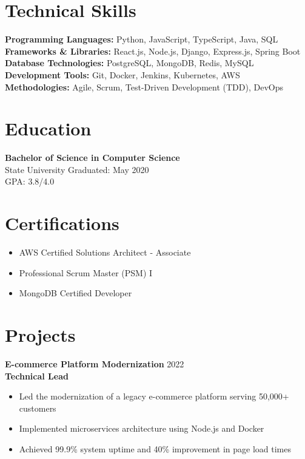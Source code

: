 \documentclass{article}
\begin{document}
\section{Technical Skills}

\textbf{Programming Languages:} Python, JavaScript, TypeScript, Java, SQL\\
\textbf{Frameworks \& Libraries:} React.js, Node.js, Django, Express.js, Spring Boot\\
\textbf{Database Technologies:} PostgreSQL, MongoDB, Redis, MySQL\\
\textbf{Development Tools:} Git, Docker, Jenkins, Kubernetes, AWS\\
\textbf{Methodologies:} Agile, Scrum, Test-Driven Development (TDD), DevOps

\section{Education}

\textbf{Bachelor of Science in Computer Science}\\
State University \hfill Graduated: May 2020\\
GPA: 3.8/4.0

\section{Certifications}
\begin{itemize}
    \item AWS Certified Solutions Architect - Associate
    \item Professional Scrum Master (PSM) I
    \item MongoDB Certified Developer
\end{itemize}

\section{Projects}

\textbf{E-commerce Platform Modernization} \hfill 2022\\
\textbf{Technical Lead}
\begin{itemize}
    \item Led the modernization of a legacy e-commerce platform serving 50,000+ customers
    \item Implemented microservices architecture using Node.js and Docker
    \item Achieved 99.9\% system uptime and 40\% improvement in page load times
\end{itemize}
\end{document}
